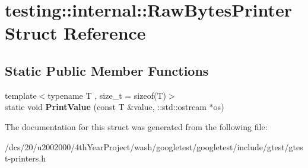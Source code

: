 \hypertarget{structtesting_1_1internal_1_1RawBytesPrinter}{}\section{testing\+:\+:internal\+:\+:Raw\+Bytes\+Printer Struct Reference}
\label{structtesting_1_1internal_1_1RawBytesPrinter}
\subsection*{Static Public Member Functions}
\begin{DoxyCompactItemize}
\item 
\mbox{\label{structtesting_1_1internal_1_1RawBytesPrinter_ad201fa1286c40751d4dc4925b6d3e3cd}} 
{\footnotesize template$<$typename T , size\+\_\+t  = sizeof(\+T)$>$ }\\static void {\bfseries Print\+Value} (const T \&value, \+::std\+::ostream $\ast$os)
\end{DoxyCompactItemize}


The documentation for this struct was generated from the following file\+:\begin{DoxyCompactItemize}
\item 
/dcs/20/u2002000/4th\+Year\+Project/wash/googletest/googletest/include/gtest/gtest-\/printers.\+h\end{DoxyCompactItemize}
